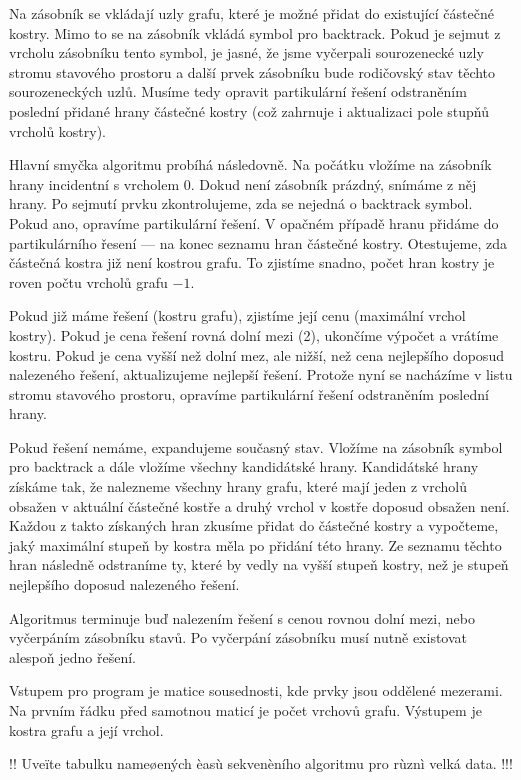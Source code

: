 \documentclass[12pt]{article}
\begin{document}
Na zásobník se vkládají uzly grafu, které je možné přidat do existující částečné kostry. Mimo to se na zásobník vkládá symbol pro backtrack. Pokud je sejmut z vrcholu zásobníku tento symbol, je jasné, že jsme vyčerpali sourozenecké uzly stromu stavového prostoru a další prvek zásobníku bude rodičovský stav těchto sourozeneckých uzlů. Musíme tedy opravit partikulární řešení odstraněním poslední přidané hrany částečné kostry (což zahrnuje i aktualizaci pole stupňů vrcholů kostry).

Hlavní smyčka algoritmu probíhá následovně. Na počátku vložíme na zásobník hrany incidentní s vrcholem 0. Dokud není zásobník prázdný, snímáme z něj hrany. Po sejmutí prvku zkontrolujeme, zda se nejedná o backtrack symbol. Pokud ano, opravíme partikulární řešení. V opačném případě hranu přidáme do partikulárního řesení --- na konec seznamu hran částečné kostry. Otestujeme, zda částečná kostra již není kostrou grafu. To zjistíme snadno, počet hran kostry je roven počtu vrcholů grafu $-1$.

Pokud již máme řešení (kostru grafu), zjistíme její cenu (maximální vrchol kostry). Pokud je cena řešení rovná dolní mezi (2), ukončíme výpočet a vrátíme kostru. Pokud je cena vyšší než dolní mez, ale nižší, než cena nejlepšího doposud nalezeného řešení, aktualizujeme nejlepší řešení. Protože nyní se nacházíme v listu stromu stavového prostoru, opravíme partikulární řešení odstraněním poslední hrany.

Pokud řešení nemáme, expandujeme současný stav. Vložíme na zásobník symbol pro backtrack a dále vložíme všechny kandidátské hrany. Kandidátské hrany získáme tak, že nalezneme všechny hrany grafu, které mají jeden z vrcholů obsažen v aktuální částečné kostře a druhý vrchol v kostře doposud obsažen není. Každou z takto získaných hran zkusíme přidat do částečné kostry a vypočteme, jaký maximální stupeň by kostra měla po přidání této hrany. Ze seznamu těchto hran následně odstraníme ty, které by vedly na vyšší stupeň kostry, než je stupeň nejlepšího doposud nalezeného řešení.

Algoritmus terminuje buď nalezením řešení s cenou rovnou dolní mezi, nebo vyčerpáním zásobníku stavů. Po vyčerpání zásobníku musí nutně existovat alespoň jedno řešení.

Vstupem pro program je matice sousednosti, kde prvky jsou oddělené mezerami. Na prvním řádku před samotnou maticí je počet vrchovů grafu. Výstupem je kostra grafu a její vrchol.

!! Uveïte tabulku nameøených èasù sekvenèního algoritmu pro rùznì velká data. !!!
\end{document}
